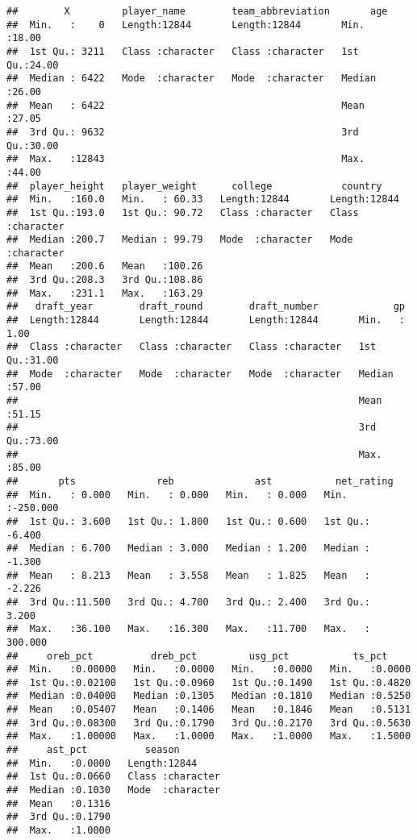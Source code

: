\documentclass[
]{book}
\begin{document}
\begin{verbatim}
##        X         player_name        team_abbreviation       age       
##  Min.   :    0   Length:12844       Length:12844       Min.   :18.00  
##  1st Qu.: 3211   Class :character   Class :character   1st Qu.:24.00  
##  Median : 6422   Mode  :character   Mode  :character   Median :26.00  
##  Mean   : 6422                                         Mean   :27.05  
##  3rd Qu.: 9632                                         3rd Qu.:30.00  
##  Max.   :12843                                         Max.   :44.00  
##  player_height   player_weight      college            country         
##  Min.   :160.0   Min.   : 60.33   Length:12844       Length:12844      
##  1st Qu.:193.0   1st Qu.: 90.72   Class :character   Class :character  
##  Median :200.7   Median : 99.79   Mode  :character   Mode  :character  
##  Mean   :200.6   Mean   :100.26                                        
##  3rd Qu.:208.3   3rd Qu.:108.86                                        
##  Max.   :231.1   Max.   :163.29                                        
##   draft_year        draft_round        draft_number             gp       
##  Length:12844       Length:12844       Length:12844       Min.   : 1.00  
##  Class :character   Class :character   Class :character   1st Qu.:31.00  
##  Mode  :character   Mode  :character   Mode  :character   Median :57.00  
##                                                           Mean   :51.15  
##                                                           3rd Qu.:73.00  
##                                                           Max.   :85.00  
##       pts              reb              ast           net_rating      
##  Min.   : 0.000   Min.   : 0.000   Min.   : 0.000   Min.   :-250.000  
##  1st Qu.: 3.600   1st Qu.: 1.800   1st Qu.: 0.600   1st Qu.:  -6.400  
##  Median : 6.700   Median : 3.000   Median : 1.200   Median :  -1.300  
##  Mean   : 8.213   Mean   : 3.558   Mean   : 1.825   Mean   :  -2.226  
##  3rd Qu.:11.500   3rd Qu.: 4.700   3rd Qu.: 2.400   3rd Qu.:   3.200  
##  Max.   :36.100   Max.   :16.300   Max.   :11.700   Max.   : 300.000  
##     oreb_pct          dreb_pct         usg_pct           ts_pct      
##  Min.   :0.00000   Min.   :0.0000   Min.   :0.0000   Min.   :0.0000  
##  1st Qu.:0.02100   1st Qu.:0.0960   1st Qu.:0.1490   1st Qu.:0.4820  
##  Median :0.04000   Median :0.1305   Median :0.1810   Median :0.5250  
##  Mean   :0.05407   Mean   :0.1406   Mean   :0.1846   Mean   :0.5131  
##  3rd Qu.:0.08300   3rd Qu.:0.1790   3rd Qu.:0.2170   3rd Qu.:0.5630  
##  Max.   :1.00000   Max.   :1.0000   Max.   :1.0000   Max.   :1.5000  
##     ast_pct          season         
##  Min.   :0.0000   Length:12844      
##  1st Qu.:0.0660   Class :character  
##  Median :0.1030   Mode  :character  
##  Mean   :0.1316                     
##  3rd Qu.:0.1790                     
##  Max.   :1.0000
\end{verbatim}
\end{document}
